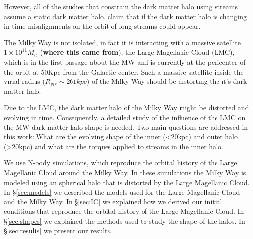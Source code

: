 
However, all of the studies that constrain the dark matter halo using streams
assume a static dark matter halo. \citep{Buist15} claim that if the dark matter
halo is changing in time misalignments on the orbit of long streams could appear.

The Milky Way is not isolated, in fact it is interacting with a
massive satellite ~$1\times10^{11}M_{\odot}$ (\textbf{where this came
from}), the Large Magellanic Cloud (LMC),
which is in the first passage about the MW and is currently at the pericenter
of the orbit at 50Kpc from the Galactic center. Such a massive satellite inside the virial
radius ($R_{vir}\sim 261kpc$) of the Milky Way should be distorting
the it's dark matter
halo. %

Due to the LMC, the dark matter halo of the Milky Way might be
distorted and evolving in time. Consequently, a detailed study of the
influence of the LMC on the MW dark matter halo shape is needed. Two
main questions are addressed in this work: What are the evolving shape of the inner
(<20kpc) and outer halo (>20kpc) and what are the torques applied
to streams in the inner halo.

We use N-body simulations, which reproduce the orbital history of the
Large Magellanic Cloud around the Milky Way. In these simulations the Milky Way is modeled
using an spherical halo that is distorted by the Large Magellanic
Cloud.
In \S\ref{sec:models} we described the models used for the Large
Magellanic Cloud and
the Milky Way. In \S\ref{sec:IC} we explained how we derived our initial
conditions that reproduce the orbital history of the Large Magellanic
Cloud. In \S\ref{sec:shapes} we explained the methods used to study
the shape of the halos. In \S\ref{sec:results} we present our
results.
